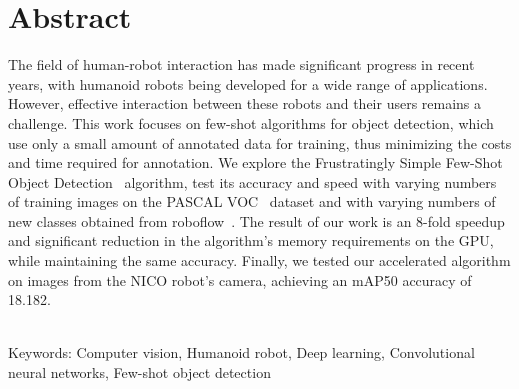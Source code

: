 \documentclass[12pt, a4paper, oneside]{book}
\begin{document}
\chapter*{Abstract}\label{chap:abstract_en}

The field of human-robot interaction has made significant progress in recent years, with humanoid robots being developed for a wide range of applications. However, effective interaction between these robots and their users remains a challenge. This work focuses on few-shot algorithms for object detection, which use only a small amount of annotated data for training, thus minimizing the costs and time required for annotation. We explore the Frustratingly Simple Few-Shot Object Detection~\cite{FSFSODT} algorithm, test its accuracy and speed with varying numbers of training images on the PASCAL VOC~\cite{VOC} dataset and with varying numbers of new classes obtained from roboflow~\cite{roboflow}. The result of our work is an 8-fold speedup and significant reduction in the algorithm's memory requirements on the GPU, while maintaining the same accuracy. Finally, we tested our accelerated algorithm on images from the NICO robot's camera, achieving an mAP50 accuracy of 18.182.

~\\
Keywords: Computer vision, Humanoid robot, Deep learning, Convolutional neural networks, Few-shot object detection 
\vfill\eject 

\tableofcontents

\mainmatter


% 








\backmatter

\nocite{*}



\listoffigures
\end{document}
